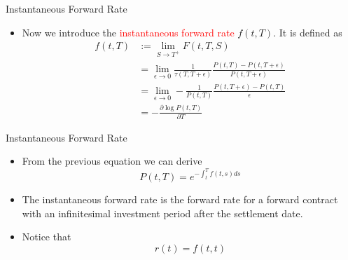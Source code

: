 \documentclass{beamer}
\begin{document}
\begin{frame}{Instantaneous Forward Rate}
	\begin{itemize}
		\item Now we introduce the \textcolor{red}{instantaneous forward rate} $f(t, T)$.
		It is defined as 
		\begin{equation}
			\begin{aligned}
			f(t, T) &:= \lim_{S\rightarrow T^+} F(t,T,S) \\
			& = \lim_{\epsilon\rightarrow 0}  \frac{1}{\tau(T,T+\epsilon)}\frac{P(t,T)-P(t,T+\epsilon)}{P(t,T+\epsilon)} \\
			& = \lim_{\epsilon\rightarrow 0} - \frac{1}{P(t,T)} \frac{P(t,T+\epsilon)-P(t,T)}{\epsilon} \\
			& = -\frac{\partial \log P(t, T)}{\partial T}
			\end{aligned}
		\end{equation}
	\end{itemize}
\end{frame}

\begin{frame}{Instantaneous Forward Rate}
	\begin{itemize}
		\item From the previous equation we can derive
		\begin{equation}
			P(t, T) = e^{-\int_t^T f(t, s) ds}
		\end{equation}
		\item The instantaneous forward rate is the forward rate for a forward contract with an infinitesimal investment period after the settlement date.
		\item Notice that
		\begin{equation}
			r(t) = f(t,t)
		\end{equation}
	\end{itemize}
\end{frame}
\end{document}
